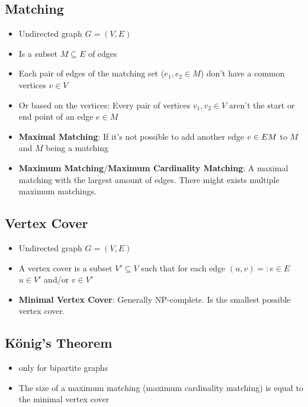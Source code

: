 \documentclass[a4paper,titlepage]{article}
\begin{document}
\subsection{Matching}
\begin{itemize}
\item Undirected graph $G = (V, E)$
\item Is a subset $M \subseteq E$ of edges
\item Each pair of edges of the matching set ($e_1, e_2 \in M$) don't have a common vertices $v \in V$
\item Or based on the vertices: Every pair of vertices $v_1, v_2 \in V$ aren't the start or end point of an edge $e \in M$
\item \textbf{Maximal Matching}: If it's not possible to add another edge $e \in E \\ M$ to $M$ and $M$ being a matching
\item \textbf{Maximum Matching}/\textbf{Maximum Cardinality Matching}: A maximal matching with the largest amount of edges. There might exists multiple maximum matchings.
\end{itemize}

\subsection{Vertex Cover}
\begin{itemize}
\item Undirected graph $G = (V, E)$
\item A vertex cover is a subset $V' \subseteq V$ such that for each edge $(u, v) =: e \in E$ $u \in V'$ and/or $v \in V'$
\item \textbf{Minimal Vertex Cover}: Generally NP-complete. Is the smallest possible vertex cover.
\end{itemize}

\subsection{König's Theorem}
\begin{itemize}
\item only for bipartite graphs
\item The size of a maximum matching (maximum cardinality matching) is equal to the minimal vertex cover
\end{itemize}
\end{document}
